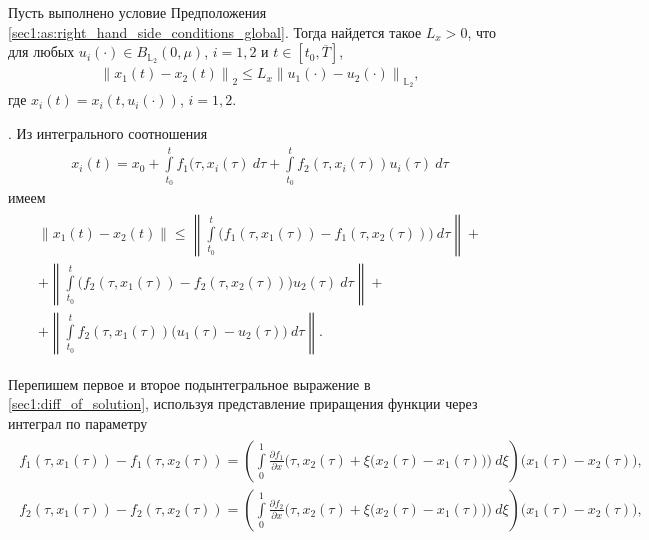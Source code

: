 \documentclass[../main.tex]{subfiles}
\begin{document}
\begin{lemma}\label{sec1:lem:lip_of_solutions_global}
    Пусть выполнено условие Предположения \ref{sec1:as:right_hand_side_conditions_global}.
    Тогда найдется такое $L_x > 0$, что для любых $u_i(\cdot) \in B_{\mathbb{L}_2}(0,\mu) $, $i = 1,2$ и $t \in [t_0, \overline{T}]$, 
    \begin{gather}
        \left\| x_1(t) - x_2(t) \right\|_2 \leqslant L_x \left\|u_1(\cdot) - u_2(\cdot) \right\|_{\mathbb{L}_2}, 
    \end{gather}
    где $x_i(t) = x_i(t,u_i(\cdot))$, $i = 1,2$. 
\end{lemma}
\doc. 
Из интегрального соотношения
\begin{gather*}
     x_i(t) = x_0 + \int\limits_{t_0}^{t} f_1(\tau, x_i(\tau)\ d\tau + \int\limits_{t_0}^{t} f_2(\tau,x_i(\tau))u_i(\tau)\ d\tau 
\end{gather*}
имеем 
\begin{gather}\label{sec1:diff_of_solution}
\begin{gathered}
    \| x_1(t) - x_2(t) \| \leqslant 
    \left\|  \int\limits_{t_0}^{t} \Big( f_1(\tau, x_1(\tau)) - f_1(\tau, x_2(\tau)) \Big) \ d\tau \right\| +  \\ + 
    \left\|  \int\limits_{t_0}^{t} \Big( f_2(\tau, x_1(\tau)) - f_2(\tau,x_2(\tau)) \Big) u_2(\tau) \ d\tau \right\| + \\ +
    \left\|  \int\limits_{t_0}^{t} f_2(\tau,x_1(\tau)) \big( u_1(\tau) - u_2(\tau) \big) \ d\tau \right\|. 
\end{gathered}
\end{gather}
    
Перепишем первое и второе подынтегральное выражение в \eqref{sec1:diff_of_solution}, используя представление приращения функции через интеграл по параметру
\begin{gather}\label{sec1:meanvalue}
\begin{gathered}
    f_1(\tau, x_1(\tau)) - f_1(\tau, x_2(\tau)) = \left(  \int\limits_0^1 \frac{\partial f_1}{\partial x} \Big(\tau, x_2(\tau) + \xi \big(x_2(\tau) - x_1(\tau)\big)\Big) \ d\xi \right) \big(x_1(\tau) - x_2(\tau)\big), \\ 
    f_2(\tau, x_1(\tau)) - f_2(\tau, x_2(\tau)) = \left(  \int\limits_0^1 \frac{\partial f_2}{\partial x} \Big(\tau, x_2(\tau) + \xi \big(x_2(\tau) - x_1(\tau)\big)\Big) \ d\xi \right) \big(x_1(\tau) - x_2(\tau)\big), 
\end{gathered}
\end{gather}
    
\end{document}
